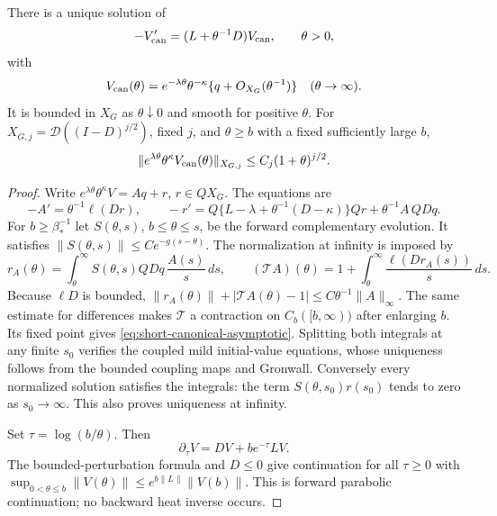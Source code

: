 \begin{proposition}
\label{prop:short-canonical}
There is a unique solution of
\[
 -V_{\rm can}'=(L+\theta^{-1}D)V_{\rm can},\qquad \theta>0,
\]
with
\begin{equation}\label{eq:short-canonical-asymptotic}
 V_{\rm can}(\theta)=e^{-\lambda\theta}\theta^{-\kappa}
     \{q+O_{X_G}(\theta^{-1})\}\quad(\theta\to\infty).
\end{equation}
It is bounded in $X_G$ as $\theta\downarrow0$ and smooth for positive
$\theta$. For $X_{G,j}=\mathcal D((I-D)^{j/2})$, fixed $j$, and
$\theta\ge b$ with a fixed sufficiently large $b$,
\[
 \|e^{\lambda\theta}\theta^\kappa V_{\rm can}(\theta)\|_{X_{G,j}}
       \le C_j(1+\theta)^{j/2}.
\]
\end{proposition}
\begin{proof}
Write $e^{\lambda\theta}\theta^\kappa V=Aq+r$, $r\in QX_G$.
The equations are
\[
 -A'=\theta^{-1}\ell(Dr),\qquad
 -r'=Q\{L-\lambda+\theta^{-1}(D-\kappa)\}Qr
                   +\theta^{-1}A\,QDq.
\]
For $b\ge\beta_*^{-1}$ let $S(\theta,s)$, $b\le\theta\le s$,
be the forward complementary evolution. It satisfies
$\|S(\theta,s)\|\le Ce^{-g(s-\theta)}$. The normalization at infinity
is imposed by
\[
 r_A(\theta)=\int_\theta^\infty
 S(\theta,s)QDq\,\frac{A(s)}s\,ds,\qquad
 (\mathcal TA)(\theta)=1+\int_\theta^\infty
                  \frac{\ell(Dr_A(s))}s\,ds.
\]
Because $\ell D$ is bounded,
$\|r_A(\theta)\|+|\mathcal TA(\theta)-1|
\le C\theta^{-1}\|A\|_\infty$. The same estimate for differences
makes $\mathcal T$ a contraction on $C_b([b,\infty))$ after enlarging
$b$. Its fixed point gives \eqref{eq:short-canonical-asymptotic}.
Splitting both integrals at any finite $s_0$ verifies the coupled
mild initial-value equations, whose uniqueness follows from the
bounded coupling maps and Gronwall. Conversely every normalized
solution satisfies the integrals: the term
$S(\theta,s_0)r(s_0)$ tends to zero as $s_0\to\infty$.
This also proves uniqueness at infinity.

Set $\tau=\log(b/\theta)$. Then
\[
 \partial_\tau V=DV+be^{-\tau}LV.
\]
The bounded-perturbation formula and $D\le0$ give continuation for
all $\tau\ge0$ with
$\sup_{0<\theta\le b}\|V(\theta)\|
\le e^{b\|L\|}\|V(b)\|$. This is forward parabolic continuation;
no backward heat inverse occurs.


\end{proof}
